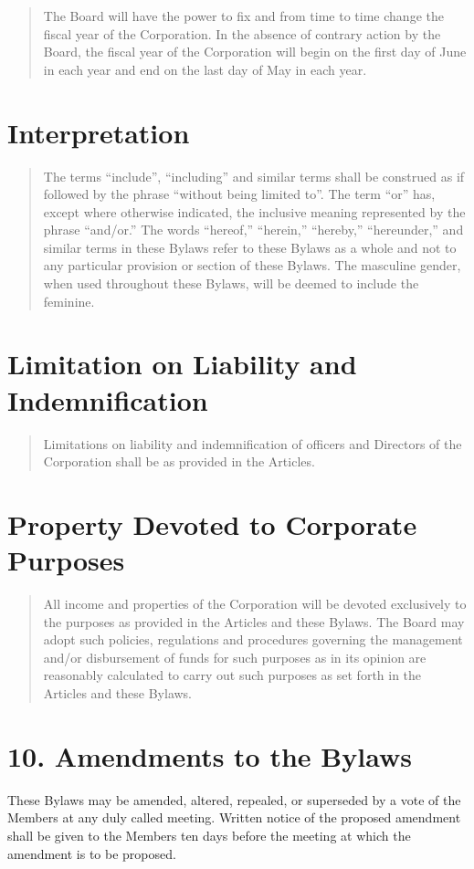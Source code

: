 \documentclass[
]{book}
\begin{document}
\begin{quote}
The Board will have the power to fix and from time to time change the
fiscal year of the Corporation. In the absence of contrary action by
the Board, the fiscal year of the Corporation will begin on the first
day of June in each year and end on the last day of May in each year.
\end{quote}

\section{Interpretation}\label{interpretation}

\begin{quote}
The terms ``include'', ``including'' and similar terms shall be construed
as if followed by the phrase ``without being limited to''. The term ``or''
has, except where otherwise indicated, the inclusive meaning
represented by the phrase ``and/or.'' The words ``hereof,'' ``herein,''
``hereby,'' ``hereunder,'' and similar terms in these Bylaws refer to
these Bylaws as a whole and not to any particular provision or section
of these Bylaws. The masculine gender, when used throughout these
Bylaws, will be deemed to include the feminine.
\end{quote}

\section{Limitation on Liability and Indemnification}\label{limitation-on-liability-and-indemnification}

\begin{quote}
Limitations on liability and indemnification of officers and Directors
of the Corporation shall be as provided in the Articles.
\end{quote}

\section{Property Devoted to Corporate Purposes}\label{property-devoted-to-corporate-purposes}

\begin{quote}
All income and properties of the Corporation will be devoted
exclusively to the purposes as provided in the Articles and these
Bylaws. The Board may adopt such policies, regulations and procedures
governing the management and/or disbursement of funds for such
purposes as in its opinion are reasonably calculated to carry out such
purposes as set forth in the Articles and these Bylaws.
\end{quote}

\section{10. Amendments to the Bylaws}\label{amendments-to-the-bylaws}

These Bylaws may be amended, altered, repealed, or superseded by a vote
of the Members at any duly called meeting. Written notice of the
proposed amendment shall be given to the Members ten days before the
meeting at which the amendment is to be proposed.
\end{document}
